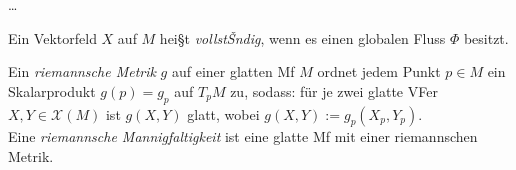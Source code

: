 \dots

\begin{defi}[VollstŠndiges VF]
Ein Vektorfeld $X$ auf $M$ hei§t \emph{vollstŠndig}, wenn es einen globalen Fluss $\Phi$ besitzt.
\end{defi}

\begin{defi}[Riemannsche Mf]
Ein \emph{riemannsche Metrik} $g$ auf einer glatten Mf $M$ ordnet jedem Punkt $p \in M$ ein Skalarprodukt $g(p) = g_p$ auf $T_pM$ zu, sodass: für je zwei glatte VFer $X, Y \in \mathcal{X}(M)$ ist $g(X, Y)$ glatt, wobei $g(X, Y) := g_p(X_p, Y_p)$. \\
Eine \emph{riemannsche Mannigfaltigkeit} ist eine glatte Mf mit einer riemannschen Metrik.
\end{defi}
